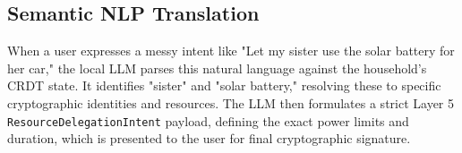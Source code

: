 \subsection{Semantic NLP Translation}
When a user expresses a messy intent like "Let my sister use the solar battery for her car," the local LLM parses this natural language against the household's CRDT state. It identifies "sister" and "solar battery," resolving these to specific cryptographic identities and resources. The LLM then formulates a strict Layer 5 \texttt{ResourceDelegationIntent} payload, defining the exact power limits and duration, which is presented to the user for final cryptographic signature.
